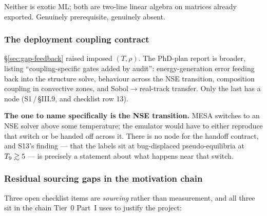 Neither is exotic ML; both are two-line linear algebra on matrices already
exported. Genuinely prerequisite, genuinely absent.

\subsubsection{The deployment coupling contract}
\label{sec:gap-coupling}

\S\ref{sec:gap-feedback} raised imposed $(T, \rho)$. The PhD-plan report is
broader, listing ``coupling-specific gates added by audit'': energy-generation
error feeding back into the structure solve, behaviour across the NSE
transition, composition coupling in convective zones, and Sobol$\to$real-track
transfer. Only the last has a node (S1\,/\,\S III.9, and checklist row 13).

\textbf{The one to name specifically is the NSE transition.} MESA switches to an
NSE solver above some temperature; the emulator would have to either reproduce
that switch or be handed off across it. There is no node for the handoff
contract, and S13's finding --- that the labels sit at bug-displaced
pseudo-equilibria at $T_{9} \gtrsim 5$ --- is precisely a statement about what
happens near that switch.

\subsubsection{Residual sourcing gaps in the motivation chain}
\label{sec:gap-sourcing}

Three open checklist items are \emph{sourcing} rather than measurement, and all
three sit in the chain Tier~0 Part~I uses to justify the project:

